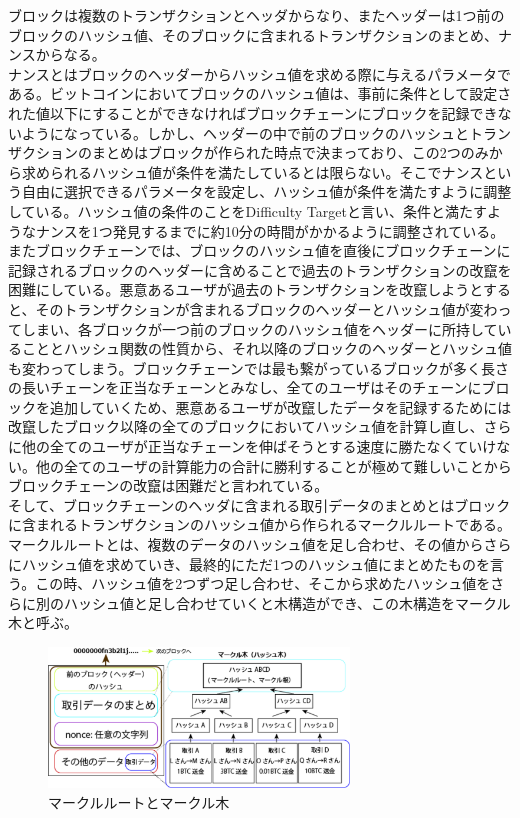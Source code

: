 \documentclass[12pt]{jarticle}
\begin{document}
ブロックは複数のトランザクションとヘッダからなり、またヘッダーは1つ前のブロックのハッシュ値、そのブロックに含まれるトランザクションのまとめ、ナンスからなる。\\
ナンスとはブロックのヘッダーからハッシュ値を求める際に与えるパラメータである。ビットコインにおいてブロックのハッシュ値は、事前に条件として設定された値以下にすることができなければブロックチェーンにブロックを記録できないようになっている。しかし、ヘッダーの中で前のブロックのハッシュとトランザクションのまとめはブロックが作られた時点で決まっており、この2つのみから求められるハッシュ値が条件を満たしているとは限らない。そこでナンスという自由に選択できるパラメータを設定し、ハッシュ値が条件を満たすように調整している。ハッシュ値の条件のことをDifficulty Targetと言い、条件と満たすようなナンスを1つ発見するまでに約10分の時間がかかるように調整されている。\\
またブロックチェーンでは、ブロックのハッシュ値を直後にブロックチェーンに記録されるブロックのヘッダーに含めることで過去のトランザクションの改竄を困難にしている。悪意あるユーザが過去のトランザクションを改竄しようとすると、そのトランザクションが含まれるブロックのヘッダーとハッシュ値が変わってしまい、各ブロックが一つ前のブロックのハッシュ値をヘッダーに所持していることとハッシュ関数の性質から、それ以降のブロックのヘッダーとハッシュ値も変わってしまう。ブロックチェーンでは最も繋がっているブロックが多く長さの長いチェーンを正当なチェーンとみなし、全てのユーザはそのチェーンにブロックを追加していくため、悪意あるユーザが改竄したデータを記録するためには改竄したブロック以降の全てのブロックにおいてハッシュ値を計算し直し、さらに他の全てのユーザが正当なチェーンを伸ばそうとする速度に勝たなくていけない。他の全てのユーザの計算能力の合計に勝利することが極めて難しいことからブロックチェーンの改竄は困難だと言われている。
\\
そして、ブロックチェーンのヘッダに含まれる取引データのまとめとはブロックに含まれるトランザクションのハッシュ値から作られるマークルルートである。マークルルートとは、複数のデータのハッシュ値を足し合わせ、その値からさらにハッシュ値を求めていき、最終的にただ1つのハッシュ値にまとめたものを言う。この時、ハッシュ値を2つずつ足し合わせ、そこから求めたハッシュ値をさらに別のハッシュ値と足し合わせていくと木構造ができ、この木構造をマークル木と呼ぶ。

\begin{figure}[h]
 \centering
   \includegraphics[width=80mm]{figures/markle.png}
 \caption{マークルルートとマークル木}
 \label{markle}
\end{figure}
\end{document}
